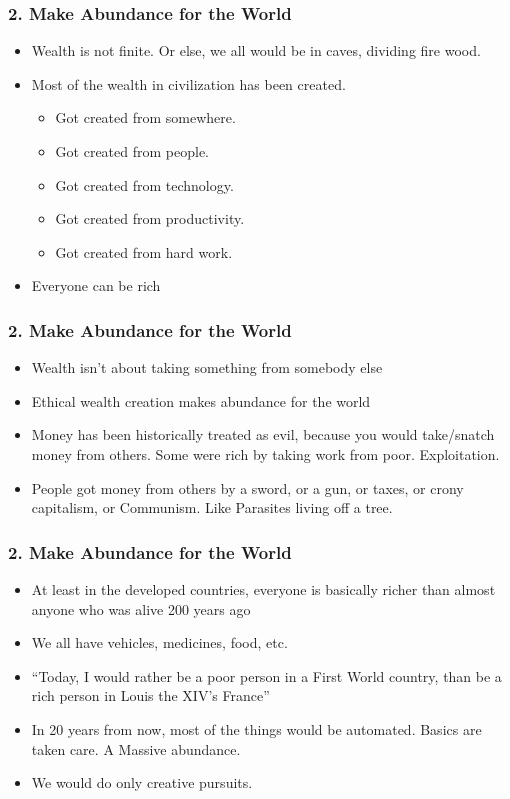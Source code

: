\begin{frame}[fragile]
\frametitle{2. Make Abundance for the World}
\begin{itemize}
\item Wealth is not finite. Or else, we all would be in caves, dividing fire wood.
\item Most of the wealth in civilization has been created.
\begin{itemize}
\item Got created from somewhere. 
\item Got created from people. 
\item Got created from technology. 
\item Got created from productivity. 
\item Got created from hard work.
\end{itemize}
\item Everyone can be rich
\end{itemize}
\end{frame}

\begin{frame}[fragile]
\frametitle{2. Make Abundance for the World}
\begin{itemize}
\item Wealth isn’t about taking something from somebody else
\item Ethical wealth creation makes abundance for the world
\item Money has been historically treated as evil, because you would take/snatch money from others. Some were rich by taking work from poor. Exploitation. 
\item People got money from others by a sword, or a gun, or taxes, or crony capitalism, or Communism. Like Parasites living off a tree.
\end{itemize}
\end{frame}

\begin{frame}[fragile]
\frametitle{2. Make Abundance for the World}
\begin{itemize}
\item At least in the developed countries, everyone is basically richer than almost anyone who was alive 200 years ago
\item We all have vehicles, medicines, food, etc.
\item ``Today, I would rather be a poor person in a First World country, than be a rich person in Louis the XIV's France''
\item In 20 years from now, most of the things would be automated. Basics are taken care. A Massive abundance.
\item We would do only creative pursuits.
\end{itemize}
\end{frame}


